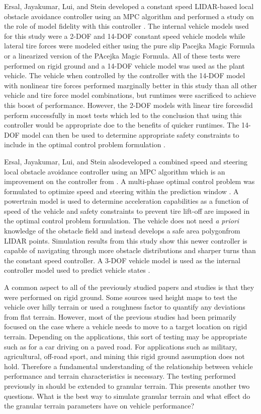 \documentclass[12pt,onecolumn]{report}
\begin{document}
Ersal, Jayakumar, Lui, and Stein developed a constant speed LIDAR-based local obstacle avoidance controller using an MPC algorithm and performed a study on the role of model fidelity with this controller \cite{ModelFidelity2016}. The internal vehicle models used for this study were a 2-DOF and 14-DOF constant speed vehicle models while lateral tire forces were modeled either using the pure slip Pacejka Magic Formula or a linearized version of the PAcejka Magic Formula. All of these tests were performed on rigid ground and a 14-DOF vehicle model was used as the plant vehicle. The vehicle when controlled by the controller with the 14-DOF model with nonlinear tire forces performed marginally better in this study than all other vehicle and tire force model combinations, but runtimes were sacrificed to achieve this boost of performance. However, the 2-DOF models with linear tire forcesdid perform successfully in most tests which led to the conclusion that using this controller would be appropriate doe to the benefits of quicker runtimes. The 14-DOF model can then be used to determine appropriate safety constraints to include in the optimal control problem formulation \cite{ModelFidelity2016}.

Ersal, Jayakumar, Lui, and Stein alsodeveloped a combined speed and steering local obstacle avoidance controller using an MPC algorithm which is an improvement on the controller from \cite{ModelFidelity2016}. A multi-phase optimal control problem was formulated to optimize speed and steering within the prediction window \cite{SpeedSteer2015}. A powertrain model is used to determine acceleration capabilities as a function of speed of the vehicle and safety constraints to prevent tire lift-off are imposed in the optimal control problem formulation. The vehicle does not need \textit{a priori} knowledge of the obstacle field and instead develops a safe area polygonfrom LIDAR points. Simulation results from this study show this newer controller is capable of navigating through more obstacle distributions and sharper turns than the constant speed controller. A 3-DOF vehicle model is used as the internal controller model used to predict vehicle states \cite{SpeedSteer2015}. 

A common aspect to all of the previously studied papers and studies is that they were performed on rigid ground. Some sources used height maps to test the vehicle over hilly terrain or used a roughness factor to quantify any deviations from flat terrain. However, most of the previous studies had been primarily focused on the case where a vehicle needs to move to a target location on rigid terrain. Depending on the applications, this sort of testing may be appropriate such as for a car driving on a paved road. For applications such as military, agricultural, off-road sport, and mining this rigid ground assumption does not hold. Therefore a fundamental understanding of the relationship between vehicle performance and terrain characteristics is necessary. The testing performed previously in \cite{ModelFidelity2016} should be extended to granular terrain. This presents another two questions. What is the best way to simulate granular terrain and what effect do the granular terrain parameters have on vehicle performance? 
\end{document}
